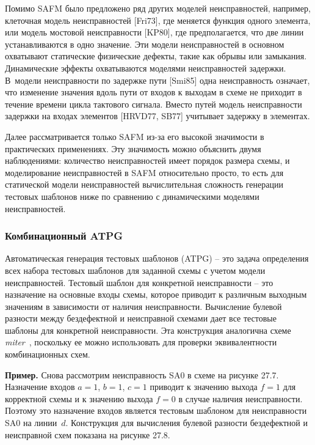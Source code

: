 Помимо SAFM было предложено ряд других моделей неисправностей, например, клеточная модель неисправностей [Fri73], где меняется функция одного элемента, или модель мостовой неисправности [KP80], где предполагается, что две линии устанавливаются в одно значение.
Эти модели неисправностей в основном охватывают статические физические дефекты, такие как обрывы или замыкания.
Динамические эффекты охватываются моделями неисправностей задержки.
В~модели неисправности по задержке пути [Smi85] одна неисправность означает, что изменение значения вдоль пути от входов к выходам в схеме не приходит в течение времени цикла тактового сигнала.
Вместо путей модель неисправности задержки на входах элементов [HRVD77, SB77] учитывает задержку в элементах.

Далее рассматривается только SAFM из-за его высокой значимости в практических применениях.
Эту значимость можно объяснить двумя наблюдениями: количество неисправностей имеет порядок размера схемы, и моделирование неисправностей в SAFM относительно просто, то есть для статической модели неисправностей вычислительная сложность генерации тестовых шаблонов ниже по сравнению с динамическими моделями неисправностей.

\subsubsection{Комбинационный ATPG}

Автоматическая генерация тестовых шаблонов (ATPG) \--- это задача определения всех набора тестовых шаблонов для заданной схемы с учетом модели неисправностей.
Тестовый шаблон для конкретной неисправности \--- это назначение на основные входы схемы, которое приводит к различным выходным значениям в зависимости от наличия неисправности.
Вычисление булевой разности между бездефектной и неисправной схемами дает все тестовые шаблоны для конкретной неисправности.
Эта конструкция аналогична схеме \textit{miter}~\cite{brand1983}, поскольку ее можно использовать для проверки эквивалентности комбинационных схем.

\textbf{Пример.}
Снова рассмотрим неисправность SA0 в схеме на рисунке 27.7.
Назначение входов $a = 1$, $b = 1$, $c = 1$ приводит к значению выхода $f = 1$ для корректной схемы и к значению выхода $f = 0$ в случае наличия неисправности.
Поэтому это назначение входов является тестовым шаблоном для неисправности SA0 на линии~$d$.
Конструкция для вычисления булевой разности бездефектной и неисправной схем показана на рисунке 27.8.

